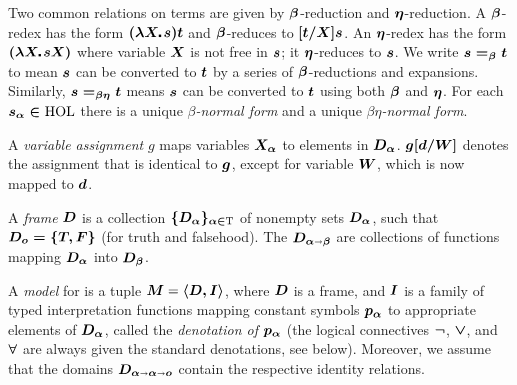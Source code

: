   Two common relations on terms are given by $\boldsymbol{\beta}$-reduction and
  $\boldsymbol{\eta}$-reduction.  A $\boldsymbol{\beta}$-redex has the form $\hol{(\lam{X}s)t}$ and
  $\boldsymbol{\beta}$-reduces to $\boldsymbol{[t/X]s}$.  An $\boldsymbol{\eta}$-redex has the form
  $\hol{(\lam{X}s X)}$ where variable $\boldsymbol{X}$ is not free in $\boldsymbol{s}$; it
  $\boldsymbol{\eta}$-reduces to $\boldsymbol{s}$.  We write $\boldsymbol{s=_{\beta} t}$ to mean $\boldsymbol{s}$ can be
  converted to $\boldsymbol{t}$ by a series of $\boldsymbol{\beta}$-reductions and expansions.
  Similarly, $\boldsymbol{s=_{\beta\eta} t}$ means $\boldsymbol{s}$ can be converted to $\boldsymbol{t}$ using both
  $\boldsymbol{\beta}$ and $\boldsymbol{\eta}$.  For each $\boldsymbol{s_\alpha\in \text{\textrm{HOL}}}$ there is a unique
  \emph{$\beta$-normal form} and a unique \emph{$\beta\eta$-normal
    form}.


A \emph{variable assignment} $g$ maps
variables $\boldsymbol{X_\alpha}$ to elements in $\boldsymbol{D_\alpha}$. $\boldsymbol{g[d/W]}$ denotes the
assignment that is identical to $\boldsymbol{g}$, except for variable $\boldsymbol{W}$, which is
now mapped to $\boldsymbol{d}$.

\begin{definition}\label{homlframe}
A \emph{frame} $\boldsymbol{D}$ is a collection $\boldsymbol{\{D_\alpha\}_{\alpha\in\text{\textrm{T}}}}$
of nonempty sets $\boldsymbol{D_\alpha}$, such that $\boldsymbol{D_o = \{T,F\}}$
(for truth and falsehood).  The
$\boldsymbol{D_{\alpha\shortrightarrow\beta}}$ are collections of functions mapping
$\boldsymbol{D_\alpha}$ into $\boldsymbol{D_\beta}$. 
\end{definition}





\begin{definition}\label{holmodel}
  A \emph{model} for \HOL is a tuple $\boldsymbol{M}=\boldsymbol{\langle D, I \rangle}$, where
  $\boldsymbol{D}$ is a frame, and $\boldsymbol{I}$ is a family of typed interpretation
  functions mapping constant symbols $\boldsymbol{p_\alpha}$ to appropriate
  elements of $\boldsymbol{D_\alpha}$, called the \emph{denotation of $\boldsymbol{p_\alpha}$}
  (the logical connectives $\boldsymbol{\neg}$, $\boldsymbol{\vee}$, and $\boldsymbol{\forall}$ are always
  given the standard denotations, see below).  Moreover, we assume that the domains
  $\boldsymbol{D_{\alpha\shortrightarrow\alpha\shortrightarrow o}}$ contain the respective identity relations.
\end{definition}


